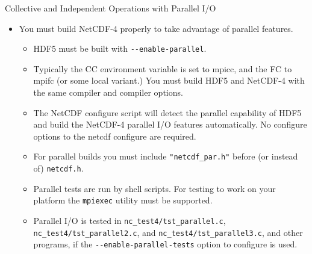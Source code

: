 \documentclass[compress,11pt,xcolor=svgnames,aspectratio=169]{beamer}
\begin{document}
\begin{frame}[fragile]{Collective and Independent Operations with Parallel I/O}

\begin{itemize}

  \item You must build NetCDF-4 properly to take advantage of parallel features.

  \begin{itemize}
  \setlength\itemsep{0.3cm}

    \item HDF5 must be built with \verb|--enable-parallel|.

    \item Typically the CC environment variable is set to mpicc, and the FC to mpifc (or some local variant.) You must build HDF5 and NetCDF-4 with the same compiler and compiler options.

    \item The NetCDF configure script will detect the parallel capability of HDF5 and build the NetCDF-4 parallel I/O features automatically. No configure options to the netcdf configure are required.

    \item For parallel builds you must include \verb|"netcdf_par.h"| before (or instead of) \verb|netcdf.h|.

    \item Parallel tests are run by shell scripts. For testing to work on your platform the \verb|mpiexec| utility must be supported.

    \item Parallel I/O is tested in \verb|nc_test4/tst_parallel.c|, \verb|nc_test4/tst_parallel2.c|, and \verb|nc_test4/tst_parallel3.c|, and other programs, if the \verb|--enable-parallel-tests| option to configure is used.

  \end{itemize}

\end{itemize}

\end{frame}
\end{document}
